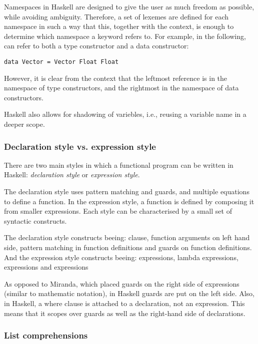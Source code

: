 Namespaces in Haskell are designed to give the user as much freedom as possible, while avoiding
ambiguity. Therefore, a set of lexemes are defined for each namespace in such a way that this,
together with the context, is enough to determine which namespace a keyword refers to. For example,
in the following,  can refer to both a type constructor and a data constructor:

\lstset{language=Haskell}
\begin{lstlisting}
data Vector = Vector Float Float
\end{lstlisting}

However, it is clear from the context that the leftmost reference is in the namespace of type
constructors, and the rightmost in the namespace of data constructors.

Haskell also allows for shadowing of variebles, i.e., reusing a variable name in a deeper 
scope.

\subsubsection{Declaration style vs. expression style}

There are two main styles in which a functional program can be written in Haskell: 
\emph{declaration style} or \emph{expression style}. 

The declaration style uses pattern matching and guards, and multiple equations
to define a function. In the expression style, a function is defined by composing it from smaller 
expressions. Each style can be characterised by a small set of syntactic constructs. 

The declaration style constructs beeing:  clause, function arguments on left hand side, 
pattern matching in function definitions and guards on function definitions. 
And the expression style constructs beeing:
 expressions, lambda expressions,  expressions and  expressions

As opposed to Miranda, which placed guards on the right side of expressions 
(similar to mathematic notation), in Haskell guards are put on the left side. Also,
in Haskell, a where clause is attached to a declaration, not an expression. This means that
it scopes over guards as well as the right-hand side of declarations.\cite{hudak2007history}


\subsubsection{List comprehensions}

